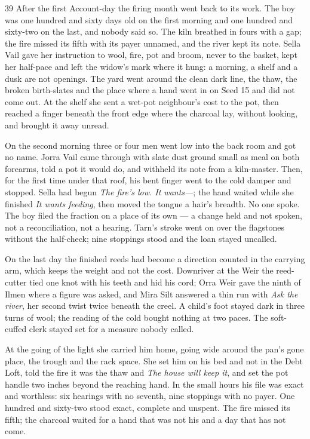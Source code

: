 \begin{CRchronicle}{39}
After the first Account-day the firing month went back to its work. The boy was one hundred and sixty days old on the first morning and one hundred and sixty-two on the last, and nobody said so. The kiln breathed in fours with a gap; the fire missed its fifth with its payer unnamed, and the river kept its note. Sella Vail gave her instruction to wool, fire, pot and broom, never to the basket, kept her half-pace and left the widow’s mark where it hung: a morning, a shelf and a dusk are not openings. The yard went around the clean dark line, the thaw, the broken birth-slates and the place where a hand went in on Seed 15 and did not come out. At the shelf she sent a wet-pot neighbour’s cost to the pot, then reached a finger beneath the front edge where the charcoal lay, without looking, and brought it away unread.

On the second morning three or four men went low into the back room and got no name. Jorra Vail came through with slate dust ground small as meal on both forearms, told a pot it would do, and withheld its note from a kiln-master. Then, for the first time under that roof, his bent finger went to the cold damper and stopped. Sella had begun \emph{The fire’s low. It wants---}; the hand waited while she finished \emph{It wants feeding}, then moved the tongue a hair’s breadth. No one spoke. The boy filed the fraction on a place of its own --- a change held and not spoken, not a reconciliation, not a hearing. Tarn’s stroke went on over the flagstones without the half-check; nine stoppings stood and the loan stayed uncalled.

On the last day the finished reeds had become a direction counted in the carrying arm, which keeps the weight and not the cost. Downriver at the Weir the reed-cutter tied one knot with his teeth and hid his cord; Orra Weir gave the ninth of Ilmen where a figure was asked, and Mira Silt answered a thin run with \emph{Ask the river}, her second twist twice beneath the creel. A child’s foot stayed dark in three turns of wool; the reading of the cold bought nothing at two paces. The soft-cuffed clerk stayed set for a measure nobody called.

At the going of the light she carried him home, going wide around the pan’s gone place, the trough and the rack space. She set him on his bed and not in the Debt Loft, told the fire it was the thaw and \emph{The house will keep it}, and set the pot handle two inches beyond the reaching hand. In the small hours his file was exact and worthless: six hearings with no seventh, nine stoppings with no payer. One hundred and sixty-two stood exact, complete and unspent. The fire missed its fifth; the charcoal waited for a hand that was not his and a day that has not come.
\end{CRchronicle}
